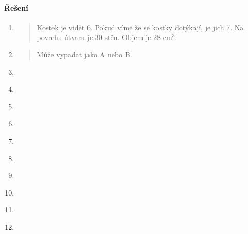 \paragraph{Řešení}
\begin{enumerate}
	\item
	\begin{quote}
		Kostek je vidět 6. Pokud víme že se kostky dotýkají, je jich 7. Na povrchu útvaru je 30 stěn. Objem je 28 cm$^{3}$.
	\end{quote}

	\item
	\begin{quote}
		Může vypadat jako A nebo B.
	\end{quote}
	
	\item
	\begin{quote}
		
	\end{quote}
	
	\item
	\begin{quote}
		
	\end{quote}
	
	\item
	\begin{quote}
		
	\end{quote}
	
	\item
	\begin{quote}
		
	\end{quote}
	
	\item
	\begin{quote}
		
	\end{quote}
	
	\item
	\begin{quote}
		
	\end{quote}
	
	\item
	\begin{quote}
		
	\end{quote}
	
	\item
	\begin{quote}
		
	\end{quote}
	
	\item
	\begin{quote}
		
	\end{quote}
	
	\item
	\begin{quote}
		
	\end{quote}
	
	
\end{enumerate}